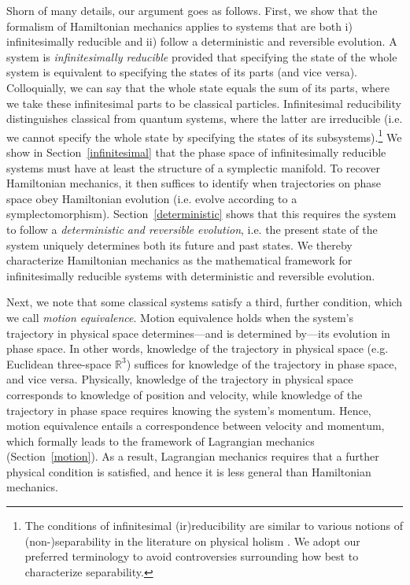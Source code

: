 \documentclass[12pt, twoside]{article}
\begin{document}
Shorn of many details, our argument goes as follows. First, we show that the formalism of Hamiltonian mechanics applies to systems that are both i) infinitesimally reducible and ii) follow a deterministic and reversible evolution. A system is \textit{infinitesimally reducible} provided that specifying the state of the whole system is equivalent to specifying the states of its parts (and vice versa). Colloquially, we can say that the whole state equals the sum of its parts, where we take these infinitesimal parts to be classical particles. Infinitesimal reducibility distinguishes classical from quantum systems, where the latter are irreducible (i.e. we cannot specify the whole state by specifying the states of its subsystems).\footnote{The conditions of infinitesimal (ir)reducibility are similar to various notions of (non-)separability in the literature on physical holism \parencites[46, 124]{Healey}. We adopt our preferred terminology to avoid controversies surrounding how best to characterize separability.} We show in Section~\ref{infinitesimal} that the phase space of infinitesimally reducible systems must have at least the structure of a symplectic manifold. To recover Hamiltonian mechanics, it then suffices to identify when trajectories on phase space obey Hamiltonian evolution (i.e. evolve according to a symplectomorphism). Section~\ref{deterministic} shows that this requires the system to follow a \textit{deterministic and reversible evolution}, i.e. the present state of the system uniquely determines both its future and past states. We thereby characterize Hamiltonian mechanics as the mathematical framework for infinitesimally reducible systems with deterministic and reversible evolution.  

Next, we note that some classical systems satisfy a third, further condition, which we call \textit{motion equivalence}. Motion equivalence holds when the system's trajectory in physical space determines---and is determined by---its evolution in phase space. In other words, knowledge of the trajectory in physical space (e.g. Euclidean three-space $\mathbb{R}^3$) suffices for knowledge of the trajectory in phase space, and vice versa. Physically, knowledge of the trajectory in physical space corresponds to knowledge of position and velocity, while knowledge of the trajectory in phase space requires knowing the system's momentum. Hence, motion equivalence entails a correspondence between velocity and momentum, which formally leads to the framework of Lagrangian mechanics (Section~\ref{motion}). As a result, Lagrangian mechanics requires that a further physical condition is satisfied, and hence it is less general than Hamiltonian mechanics. 
\end{document}
